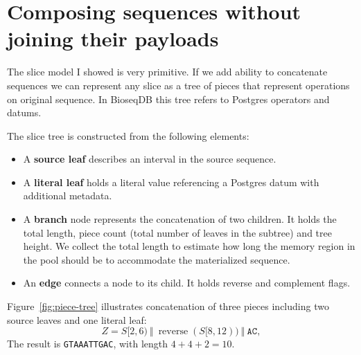\section{Composing sequences without joining their payloads}
\label{sec:sequence-piece-tree}

The slice model I showed is very primitive. If we add ability to concatenate sequences we can represent any slice as a tree of pieces that represent operations on original sequence.
In BioseqDB this tree refers to Postgres operators and datums.

The slice tree is constructed from the following elements:
\begin{itemize}
  \item A \textbf{source leaf} describes an interval in the source sequence.
  \item A \textbf{literal leaf} holds a literal value referencing a Postgres datum with additional metadata.
  \item A \textbf{branch} node represents the concatenation of two children. It holds the total length, piece count (total number of leaves in the subtree) and tree height. We collect the total length to estimate how long the memory region in the pool should be to accommodate the materialized sequence.
  \item An \textbf{edge} connects a node to its child. It holds reverse and complement flags.
\end{itemize}

Figure~\ref{fig:piece-tree} illustrates concatenation of three pieces including two source leaves and one literal leaf:
\[
  Z=S[2,6)\ \Vert\ \operatorname{reverse}(S[8,12))\ \Vert\ \texttt{AC},
\]
The result is \texttt{GTAAATTGAC}, with length \(4+4+2=10\).

